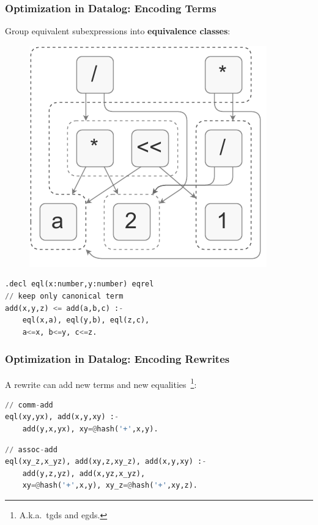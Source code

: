 \documentclass{beamer}
\begin{document}
\begin{frame}[fragile]
    \frametitle{Optimization in Datalog: Encoding Terms}
    Group equivalent subexpressions into \textbf{equivalence classes}:
    \begin{figure}
        \includegraphics[height=0.4\textheight]{egraph4.pdf}
    \end{figure}
    \pause
    \begin{lstlisting}[language=Python]
.decl eql(x:number,y:number) eqrel
// keep only canonical term
add(x,y,z) <= add(a,b,c) :-
    eql(x,a), eql(y,b), eql(z,c),
    a<=x, b<=y, c<=z.
    \end{lstlisting}
\end{frame}

\begin{frame}[fragile]
    \frametitle{Optimization in Datalog: Encoding Rewrites}
     A rewrite can add new terms and new equalities~\footnote{A.k.a.\ tgds and egds.}:
     \begin{lstlisting}[language=Python]
// comm-add
eql(xy,yx), add(x,y,xy) :- 
    add(y,x,yx), xy=@hash('+',x,y).
    \end{lstlisting}
    \pause
    \begin{lstlisting}[language=Python]
// assoc-add
eql(xy_z,x_yz), add(xy,z,xy_z), add(x,y,xy) :-
    add(y,z,yz), add(x,yz,x_yz),
    xy=@hash('+',x,y), xy_z=@hash('+',xy,z).
    \end{lstlisting}
\end{frame}
\end{document}

